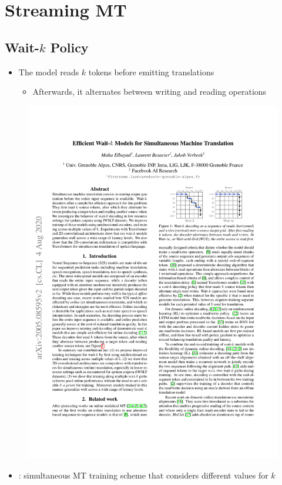 \documentclass[landscape]{article}
\begin{document}
\cp
\section*{Streaming MT}
\vspace*{10mm}

\subsection*{Wait-$k$ Policy}
\vspace*{5mm}
\begin{itemize}\itemsep=5mm
	\item The model reads $k$ tokens before emitting translations
	\begin{itemize}
		\item Afterwards, it alternates between writing and reading operations
	\end{itemize}
\end{itemize}
\begin{figure}[!htp]
\centering
\includegraphics[trim=0.1cm 0.1cm 0.1cm 0.4cm, scale=2.5, clip]{figures/elbayad2020-waitk}
\end{figure}
\begin{itemize}
	\item {}: simultaneous MT training scheme that considers different values for $k$
\end{itemize}
\end{document}
